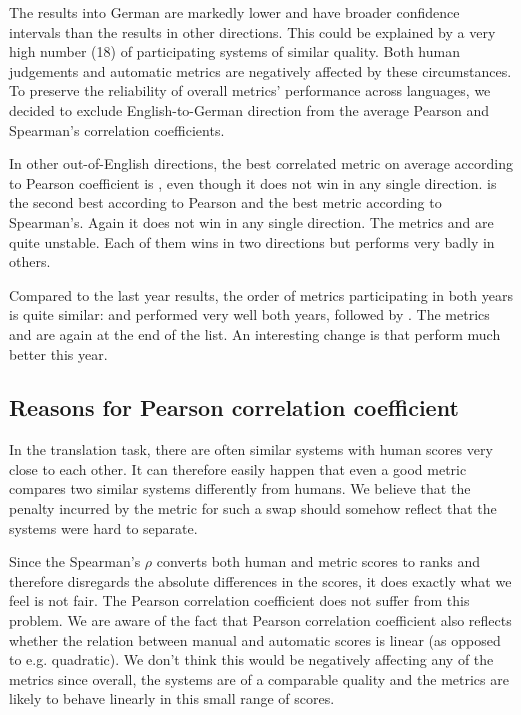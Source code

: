 The results into German are markedly lower and have broader confidence
intervals than the results in other directions. This could be explained by a
very
high number (18) of participating systems of similar quality. 
Both human judgements and automatic metrics are negatively affected by these
circumstances. To preserve the reliability of overall metrics' performance
across languages, we
decided to exclude English-to-German
direction from the average Pearson and Spearman's correlation coefficients.

In other out-of-English directions, the best correlated metric on average according
to Pearson coefficient is , even though it does not win in any
single direction.  is the second best according to Pearson
and the best metric according to Spearman's. Again it does not win in any
single direction. The metrics  and  are quite
unstable.  Each of them wins in two directions but performs very badly in
others.

Compared to the last year results, the order of metrics participating in both
years is quite similar:  and  performed very well
both years, followed by . The metrics  and 
are again at the end of the list. An interesting change is that
 perform much better this year.

\subsection{Reasons for Pearson correlation coefficient}

In the translation task, there are often similar systems with human scores very
close to each other. It can therefore easily happen that even a good metric
compares two similar systems differently from humans. We believe that the
penalty incurred by the metric for such a swap should somehow reflect that the
systems were hard to separate.

Since the Spearman's $\rho$ converts both human and metric scores to ranks and
therefore disregards the absolute differences in the scores, it does exactly what
we feel is not fair. The Pearson correlation coefficient does not suffer from this 
problem. We are aware of the fact that Pearson correlation coefficient also
reflects whether the relation between manual and automatic scores is linear (as
opposed to e.g. quadratic). We don't think this would be negatively affecting
any of the metrics since overall, the systems are of a comparable quality and
the metrics are likely to behave linearly in this small
range of scores.

